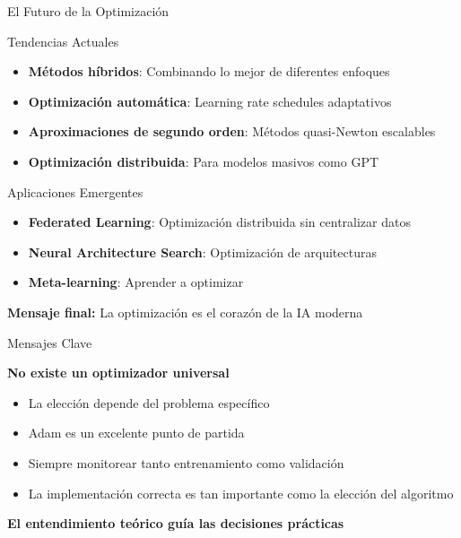 \documentclass[10pt]{beamer}
\begin{document}
\begin{frame}{El Futuro de la Optimización}
\begin{block}{Tendencias Actuales}
\begin{itemize}
\item \textbf{Métodos híbridos}: Combinando lo mejor de diferentes enfoques
\item \textbf{Optimización automática}: Learning rate schedules adaptativos
\item \textbf{Aproximaciones de segundo orden}: Métodos quasi-Newton escalables
\item \textbf{Optimización distribuida}: Para modelos masivos como GPT
\end{itemize}
\end{block}

\begin{exampleblock}{Aplicaciones Emergentes}
\begin{itemize}
\item \textbf{Federated Learning}: Optimización distribuida sin centralizar datos
\item \textbf{Neural Architecture Search}: Optimización de arquitecturas
\item \textbf{Meta-learning}: Aprender a optimizar
\end{itemize}
\end{exampleblock}

\vspace{0.5cm}
\textcolor{azulUni}{\textbf{Mensaje final:}} La optimización es el corazón de la IA moderna
\end{frame}

\begin{frame}{Mensajes Clave}
\begin{center}
\Large
\textbf{No existe un optimizador universal}
\end{center}

\vspace{0.5cm}

\begin{itemize}
\item La elección depende del problema específico
\item Adam es un excelente punto de partida
\item Siempre monitorear tanto entrenamiento como validación
\item La implementación correcta es tan importante como la elección del algoritmo
\end{itemize}

\vspace{0.5cm}

\begin{center}
\textcolor{azulUni}{\textbf{El entendimiento teórico guía las decisiones prácticas}}
\end{center}
\end{frame}
\end{document}
